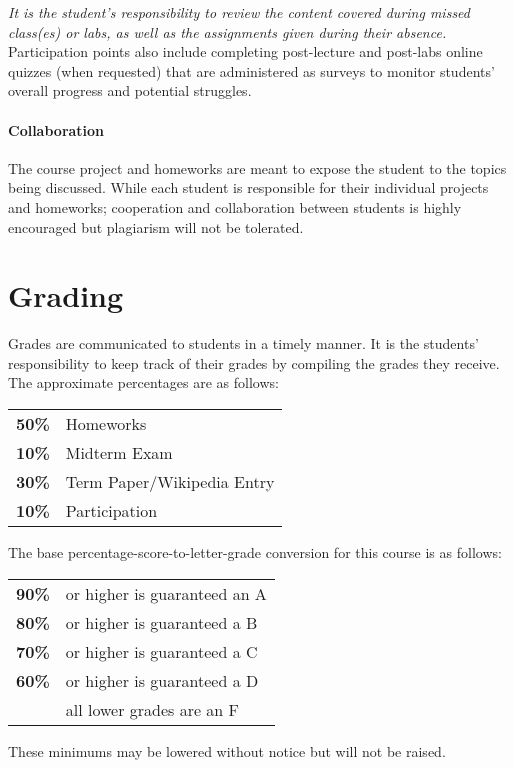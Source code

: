 \documentclass[12pt]{scrartcl}
\begin{document}
\textit{It is the student's responsibility to review the content covered during missed class(es) or labs, as well as the assignments given during their absence.}
Participation points also include completing post-lecture and post-labs online quizzes (when requested) that are administered as surveys to monitor students’ overall progress and potential struggles.

\paragraph{Collaboration} 
The course project and homeworks are meant to expose the student to the topics being discussed. 
While each student is responsible for their individual projects and homeworks; 
cooperation and collaboration between students is highly encouraged but plagiarism will not be tolerated.

\section{Grading}

Grades are communicated to students in a timely manner. 
It is the students’ responsibility to keep track of their grades by compiling the grades they receive. 
The approximate percentages are as follows:
\begin{center}
\begin{tabular}{rl}
\textbf{50\% } & Homeworks\\
\textbf{10\% } & Midterm Exam\\
\textbf{30\% } & Term Paper/Wikipedia Entry \\
\textbf{10\% } & Participation\\
\end{tabular}
\end{center}

The base percentage-score-to-letter-grade conversion for this course is as follows: 
\begin{center}
\begin{tabular}{rl}
\textbf{90\%}& or higher is guaranteed an A \\
\textbf{80\%}& or higher is guaranteed a B \\
\textbf{70\%}& or higher is guaranteed a C \\
\textbf{60\%}& or higher is guaranteed a D \\
\textbf{}& all lower grades are an F 
\end{tabular}
\end{center}
These minimums may be lowered without notice but will not be raised. 
\end{document}
